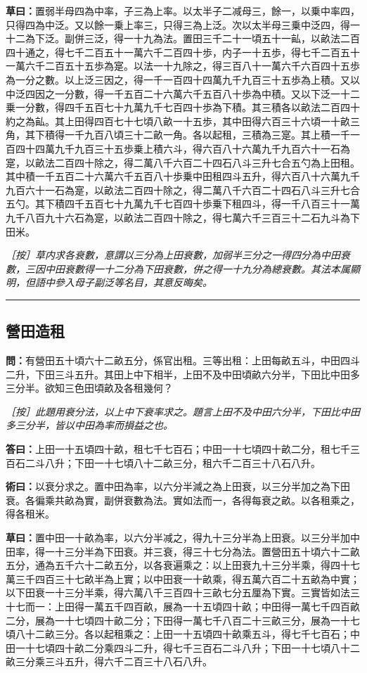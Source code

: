 \documentclass[11pt,a4paper]{article}
\newcommand{\longline}{\noindent\rule{\textwidth}{0.4pt}}
\newcommand{\Question}[1]{\par\noindent\textbf{\color{problemcolor}問：}#1\par}
\newcommand{\Answer}[1]{\par\noindent\textbf{\color{answercolor}答曰：}#1\par}
\newcommand{\Method}[1]{\par\noindent\textbf{\color{methodcolor}術曰：}#1\par}
\newcommand{\Working}[1]{\par\noindent\textbf{草曰：}#1\par}
\newcommand{\EditorialNote}[1]{\par\noindent\textit{［按］#1}\par}
\begin{document}
\Working{置弱半母四為中率，子三為上率。以太半子二减母三，餘一，以乗中率四，只得四為中泛。又以餘一乗上率三，只得三為上泛。次以太半母三乗中泛四，得一十二為下泛。副併三泛，得一十九為法。置田三千二十一頃五十一畆，以畝法二百四十通之，得七千二百五十一萬六千二百四十歩，内子一十五歩，得七千二百五十一萬六千二百五十五歩為寔。以法一十九除之，得三百八十一萬六千六百四十五歩為一分之數。以上泛三因之，得一千一百四十四萬九千九百三十五歩為上積。又以中泛四因之一分數，得一千五百二十六萬六千五百八十歩為中積。又以下泛一十二乗一分數，得四千五百七十九萬九千七百四十歩為下積。其三積各以畝法二百四十約之為畆。其上田得四百七十七頃八畝一十五歩，其中田得六百三十六頃一十畝三角，其下積得一千九百八頃三十二畝一角。各以起租，三積為三寔。其上積一千一百四十四萬九千九百三十五歩乗上積六斗，得六百八十六萬九千九百六十一石為寔，以畝法二百四十除之，得二萬八千六百二十四石八斗三升七合五勺為上田租。其中積一千五百二十六萬六千五百八十歩乗中田租四斗五升，得六百八十六萬九千九百六十一石為寔，以畝法二百四十除之，得二萬八千六百二十四石八斗三升七合五勺。其下積四千五百七十九萬九千七百四十歩乗下租四斗，得一千八百三十一萬九千八百九十六石為寔，以畝法二百四十除之，得七萬六千三百三十二石九斗為下田米。}

\EditorialNote{草内求各衰數，意謂以三分為上田衰數，加弱半三分之一得四分為中田衰數，三因中田衰數得一十二分為下田衰數，併之得一十九分為總衰數。其法本属顯明，但語中參入母子副泛等名目，其意反晦矣。}

\longline

\subsection*{\color{sectioncolor}營田造租}

\Question{有營田五十頃六十二畝五分，係官出租。三等出租：上田每畝五斗，中田四斗二升，下田三斗五升。其田上中下相半，上田不及中田頃畝六分半，下田比中田多三分半。欲知三色田頃畝及各租幾何？}

\EditorialNote{此題用衰分法，以上中下衰率求之。題言上田不及中田六分半，下田比中田多三分半，皆以中田為率而損益之也。}

\Answer{上田一十五頃四十畝，租七千七百石；中田一十七頃四十畝二分，租七千三百石二斗八升；下田一十七頃八十二畝三分，租六千二百三十八石八升。}

\Method{以衰分求之。置中田為率，以六分半減之為上田衰，以三分半加之為下田衰。各徧乘共畝為實，副併衰數為法。實如法而一，各得每衰之畝。以各租乘之，得各租米。}

\Working{置中田一十畝為率，以六分半减之，得九十三分半為上田衰。以三分半加中田率，得一十三分半為下田衰。并三衰，得三十七分為法。置營田五十頃六十二畝五分，通為五千六十二畝五分，以各衰遍乘之：以上田衰九十三分半乘，得四十七萬三千四百三十七畝半為上實；以中田衰一十畝乘，得五萬六百二十五畝為中實；以下田衰一十三分半乘，得六萬八千三百四十三畝七分五厘為下實。三實皆如法三十七而一：上田得一萬五千四百畝，展為一十五頃四十畝；中田得一萬七千四百畝二分，展為一十七頃四十畝二分；下田得一萬七千八百二十三畝三分，展為一十七頃八十二畝三分。各以起租乘之：上田一十五頃四十畝乘五斗，得七千七百石；中田一十七頃四十畝二分乘四斗二升，得七千三百石二斗八升；下田一十七頃八十二畝三分乘三斗五升，得六千二百三十八石八升。}
\end{document}
